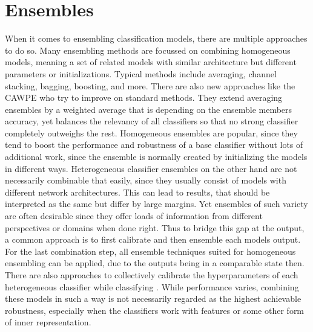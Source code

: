 \section{Ensembles}
\label{sec:ensembles}

When it comes to ensembling classification models, there are multiple approaches to do so. Many ensembling methods are focussed on combining homogeneous 
models, meaning a set of related models with similar architecture but different parameters or initializations. Typical methods \cite{Opitz_1999ensemblebasics} include 
averaging, channel stacking, bagging, boosting, and more. There are also new approaches like the CAWPE \cite{Large_2019CAPE} who try to improve on standard methods. They extend averaging ensembles by 
a weighted average that is depending on the ensemble members accuracy, yet balances the relevancy of all classifiers so that no strong classifier completely outweighs the rest.\newline
Homogeneous ensembles are popular, since they tend to boost the performance and robustness of a base classifier without lots 
of additional work, since the ensemble is normally created by initializing the models in different ways.
Heterogeneous classifier ensembles on the other hand are not necessarily combinable that easily, since they usually consist of models with 
different network architectures. This can lead to results, that should be interpreted as the same but differ by large margins. Yet 
ensembles of such variety are often desirable since they offer loads of information from different perspectives or domains when done right. 
Thus to bridge this gap at the output, a common approach is to first calibrate \cite{Guo_2017_tempscalingetc} and then ensemble each models 
output. For the last combination step, all ensemble techniques suited for homogeneous ensembling can 
be applied, due to the outputs being in a comparable state then. There are also approaches to collectively calibrate the hyperparameters 
of each heterogeneous classifier while classifying \cite{Guo_2017_tempscalingetc}. While performance varies, combining 
these models in such a way is not necessarily regarded as the highest achievable robustness, especially when the classifiers work with features or some other form of inner representation. 
